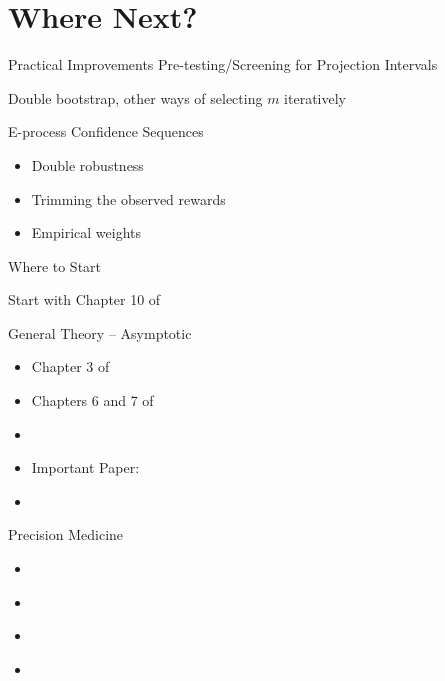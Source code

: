 \documentclass[aspectratio=169, professionalfonts]{beamer}
\begin{document}

\section{Where Next?}

\begin{frame}{Practical Improvements}
	Pre-testing/Screening for Projection Intervals
	\vfill

	Double bootstrap, other ways of selecting $m$ iteratively

	\vfill

	E-process Confidence Sequences
	\begin{itemize}
		\item Double robustness
		\item Trimming the observed rewards
		\item Empirical weights
	\end{itemize}
\end{frame}


\begin{frame}{Where to Start}
	\vfill

	Start with Chapter 10 of \cite{tsiatis2019Dynamic}
	\vfill

\end{frame}

\begin{frame}{General Theory -- Asymptotic}
	\vfill
	\begin{itemize}
		\item Chapter 3 of \cite{tsiatis2006Semiparametric}
		      \vfill
		\item Chapters 6 and 7 of \cite{vandervaart2000Asymptotic}
		      \vfill
		\item \cite{kosorok2008Introduction}
		      \vfill
		\item Important Paper: \cite{hirano2012Impossibility}
		      \vfill


		\item 	\cite{bibaut2021PostContextualBandit}
		      \vfill
	\end{itemize}
\end{frame}

\begin{frame}{Precision Medicine}
	\vfill
	\begin{itemize}
		\item \cite{laber2014Dynamic}
		      \vfill

		\item 	\cite{luedtke2016Statistical}
		      \vfill

		\item 	\cite{shi2022Statistical}

		\item \cite{hadad2021Confidence}
	\end{itemize}
	\vfill

\end{frame}
\end{document}
